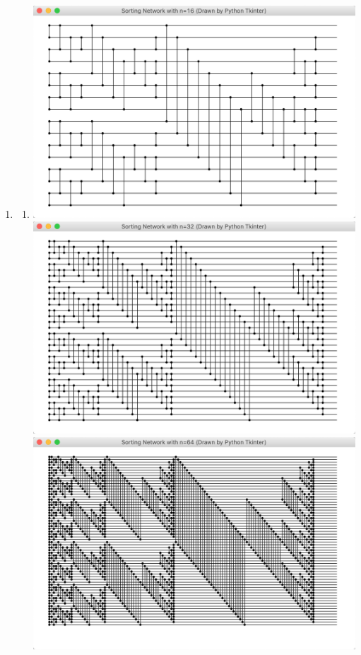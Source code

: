 \documentclass[12pt,a4paper]{article}
\makeatletter
\newtheorem*{solution}{Solution}
\theoremstyle{definition}
\renewenvironment{solution}[1][Solution] {\par\pushQED{\qed}\normalfont\topsep6\p@\@plus6\p@\relax\trivlist\item[\hskip\labelsep\bfseries#1\@addpunct{.}]\ignorespaces}{\popQED\endtrivlist\@endpefalse} \makeatother
\makeatother
\begin{document}
\begin{enumerate}
\begin{enumerate}
    \end{enumerate}
	\begin{solution}
		\hfill \break
		\begin{enumerate}
			\item 
			\includegraphics[scale=0.3]{2n=16} 
			\includegraphics[scale=0.3]{2n=32} \\
			\includegraphics[scale=0.3]{2n=64} 

\end{enumerate}
\end{solution}
\end{enumerate}
\end{document}
